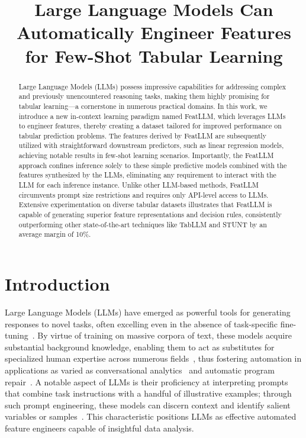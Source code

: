 \title{Large Language Models Can Automatically Engineer Features for Few-Shot Tabular Learning}

\begin{abstract}
Large Language Models (LLMs) possess impressive capabilities for addressing complex and previously unencountered reasoning tasks, making them highly promising for tabular learning—a cornerstone in numerous practical domains. In this work, we introduce a new in-context learning paradigm named \textsf{FeatLLM}, which leverages LLMs to engineer features, thereby creating a dataset tailored for improved performance on tabular prediction problems. The features derived by \textsf{FeatLLM} are subsequently utilized with straightforward downstream predictors, such as linear regression models, achieving notable results in few-shot learning scenarios. Importantly, the \textsf{FeatLLM} approach confines inference solely to these simple predictive models combined with the features synthesized by the LLMs, eliminating any requirement to interact with the LLM for each inference instance. Unlike other LLM-based methods, \textsf{FeatLLM} circumvents prompt size restrictions and requires only API-level access to LLMs. Extensive experimentation on diverse tabular datasets illustrates that \textsf{FeatLLM} is capable of generating superior feature representations and decision rules, consistently outperforming other state-of-the-art techniques like TabLLM and STUNT by an average margin of 10\%.
\end{abstract}

\section{Introduction}
Large Language Models (LLMs) have emerged as powerful tools for generating responses to novel tasks, often excelling even in the absence of task-specific fine-tuning~\cite{creswell2022selection,imani2023mathprompter,taylor2022galactica}. By virtue of training on massive corpora of text, these models acquire substantial background knowledge, enabling them to act as substitutes for specialized human expertise across numerous fields~\cite{Genomes2021,singhal2023large,wilcox2003role}, thus fostering automation in applications as varied as conversational analytics~\cite{finch2023leveraging} and automatic program repair~\cite{fan2023automated}. A notable aspect of LLMs is their proficiency at interpreting prompts that combine task instructions with a handful of illustrative examples; through such prompt engineering, these models can discern context and identify salient variables or samples~\cite{brown2020language,zhao2023survey}. This characteristic positions LLMs as effective automated feature engineers capable of insightful data analysis.

